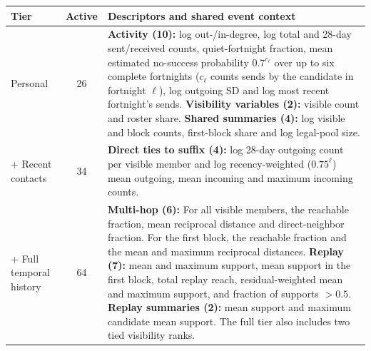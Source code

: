 \begin{tabular}{@{}>{\raggedright\arraybackslash}p{1.85cm}c>{\raggedright\arraybackslash}p{8.8cm}@{}}
\toprule
Tier & Active & Descriptors and shared event context \\
\midrule
Personal & 26 & \textbf{Activity (10):} log out-/in-degree, log total and 28-day sent/received counts, quiet-fortnight fraction, mean estimated no-success probability $0.7^{c_\ell}$ over up to six complete fortnights ($c_\ell$ counts sends by the candidate in fortnight $\ell$), log outgoing SD and log most recent fortnight's sends. \textbf{Visibility variables (2):} visible count and roster share. \textbf{Shared summaries (4):} log visible and block counts, first-block share and log legal-pool size. \\
+ Recent contacts & 34 & \textbf{Direct ties to suffix (4):} log 28-day outgoing count per visible member and log recency-weighted ($0.75^\ell$) mean outgoing, mean incoming and maximum incoming counts. \\
+ Full temporal history & 64 & \textbf{Multi-hop (6):} For all visible members, the reachable fraction, mean reciprocal distance and direct-neighbor fraction. For the first block, the reachable fraction and the mean and maximum reciprocal distances. \textbf{Replay (7):} mean and maximum support, mean support in the first block, total replay reach, residual-weighted mean and maximum support, and fraction of supports $>0.5$. \textbf{Replay summaries (2):} mean support and maximum candidate mean support. The full tier also includes two tied visibility ranks. \\
\bottomrule
\end{tabular}
